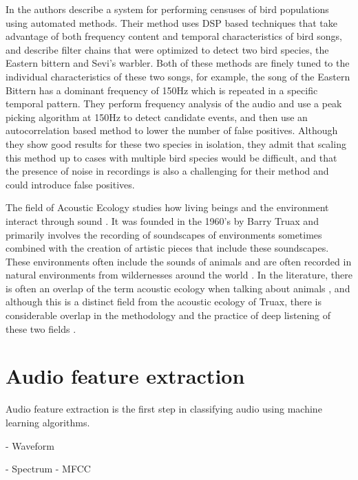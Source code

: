 \documentclass[12pt,oneside]{book}
\begin{document}
In \cite{bardeli10} the authors describe a system for performing
censuses of bird populations using automated methods.  Their method
uses DSP based techniques that take advantage of both frequency
content and temporal characteristics of bird songs, and describe
filter chains that were optimized to detect two bird species, the
Eastern bittern and Sevi's warbler.  Both of these methods are finely
tuned to the individual characteristics of these two songs, for
example, the song of the Eastern Bittern has a dominant frequency of
150Hz which is repeated in a specific temporal pattern.  They perform
frequency analysis of the audio and use a peak picking algorithm at
150Hz to detect candidate events, and then use an autocorrelation
based method to lower the number of false positives.  Although they
show good results for these two species in isolation, they admit that
scaling this method up to cases with multiple bird species would be
difficult, and that the presence of noise in recordings is also a
challenging for their method and could introduce false positives.

The field of Acoustic Ecology studies how living beings and the
environment interact through sound \cite{wrightson2000introduction}.
It was founded in the 1960's by Barry Truax \cite{truax2001handbook}
and primarily involves the recording of soundscapes of environments
sometimes combined with the creation of artistic pieces
\cite{westerkamp2002linking} that include these soundscapes.  These
environments often include the sounds of animals and are often
recorded in natural environments from wildernesses
\cite{smith2004listening} around the world
\cite{feld1994ethnomusicology}.  In the literature, there is often an
overlap of the term acoustic ecology when talking about animals
\cite{nowacek2005acoustic} \cite{kroodsma1996ecology}, and although
this is a distinct field from the acoustic ecology of Truax, there is
considerable overlap in the methodology and the practice of deep
listening of these two fields \cite{redstrom1998acoustic}.


\section{Audio feature extraction}
\label{section:relatedWork:audioFeatureExtraction}

Audio feature extraction is the first step in classifying audio using
machine learning algorithms.  

- Waveform

- Spectrum
	- MFCC
\end{document}
